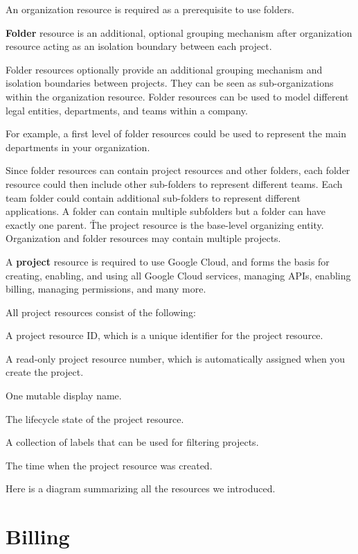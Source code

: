 An organization resource is required as a prerequisite to use folders.

\bd[Folder]
\textbf{Folder} resource is an additional, optional grouping mechanism after organization resource acting as an
isolation boundary between each project.
\ed

Folder resources optionally provide an additional grouping mechanism and isolation boundaries between projects. They
can be seen as sub-organizations within the organization resource. Folder resources can be used to model different
legal entities, departments, and teams within a company.

\be
For example, a first level of folder resources could be used to represent the main departments in your organization.
\ee

Since folder resources can contain project resources and other folders, each folder resource could then include other
sub-folders to represent different teams. Each team folder could contain additional sub-folders to represent
different applications. A folder can contain multiple subfolders but a folder can have exactly one parent. \v

The project resource is the base-level organizing entity. Organization and folder resources may contain multiple
projects.

\bd[Project]
A \textbf{project} resource is required to use Google Cloud, and forms the basis for creating, enabling, and using
all Google Cloud services, managing APIs, enabling billing, managing permissions, and many more.
\ed

All project resources consist of the following:
\bit
\item A project resource ID, which is a unique identifier for the project resource.
\item A read-only project resource number, which is automatically assigned when you create the project.
\item One mutable display name.
\item The lifecycle state of the project resource.
\item A collection of labels that can be used for filtering projects.
\item The time when the project resource was created.
\eit

Here is a diagram summarizing all the resources we introduced.


\section{Billing}

